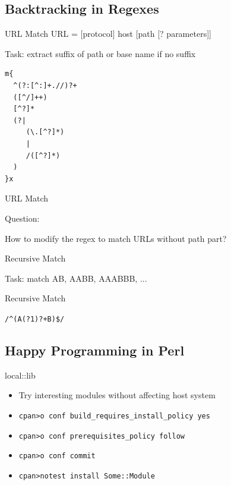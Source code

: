 \documentclass{beamer}
\begin{document}
  \subsection{Backtracking in Regexes}

\begin{frame}[containsverbatim]{URL Match}
URL = [protocol] host [path [? parameters]]

Task: extract suffix of path or base name if no suffix
\begin{lstlisting}[caption=URL match]
m{
  ^(?:[^:]+.//)?+
  ([^/]++)
  [^?]*
  (?|
     (\.[^?]*)
     |
     /([^?]*)
  )
}x
\end{lstlisting}
\end{frame}

\begin{frame}{URL Match}
  \begin{center}
    Question:

    How to modify the regex to match URLs without path part?
  \end{center}
\end{frame}

\begin{frame}{Recursive Match}
  \begin{center}
    Task: match AB, AABB, AAABBB, ...
  \end{center}
\end{frame}

\begin{frame}[containsverbatim]{Recursive Match}
  \begin{center}
    \lstinline!/^(A(?1)?+B)$/!
  \end{center}
\end{frame}


    \subsection{Happy Programming in Perl}

\begin{frame}{local::lib}
  \begin{itemize}
    \item Try interesting modules without affecting host system
    \item \texttt{cpan>o conf build\_requires\_install\_policy yes}
    \item \texttt{cpan>o conf prerequisites\_policy follow}
    \item \texttt{cpan>o conf commit}
    \item \texttt{cpan>notest install Some::Module}
  \end{itemize}
\end{frame}
\end{document}
